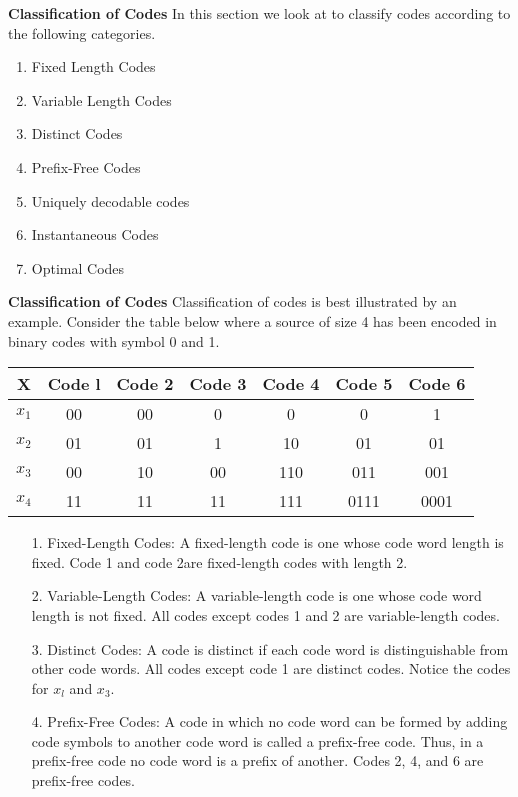 

\noindent \textbf{Classification of Codes}
In this section we look at to classify codes according to the following categories.
\begin{enumerate}
\item Fixed Length Codes
\item Variable Length Codes
\item Distinct Codes
\item Prefix-Free Codes
\item Uniquely decodable codes
\item Instantaneous Codes
\item Optimal Codes
\end{enumerate}


\noindent \textbf{Classification of Codes}
Classification of codes is best illustrated by an example. Consider the table below where a source of
size 4 has been encoded in binary codes with symbol 0 and 1.\\ \bigskip
\begin{center}
\begin{tabular}{|c| c| c| c| c| c| c|}
\hline
X& Code l& Code 2& Code 3 &Code 4& Code 5& Code 6\\\hline
$x_1$& 00& 00 &0 &0 &0 &1\\
$x_2$& 01& 01 &1 &10 &01 &01\\
$x_3$ &00 &10& 00& 110& 011 &001\\
$x_4$ &11& 11& 11& 111 &0111 &0001\\\hline
\end{tabular}
\end{center}




\begin{itemize}
\item[1.] Fixed-Length Codes: A fixed-length code is one whose code word length is fixed. Code 1 and code 2are
fixed-length codes with length 2.
\item[2.] Variable-Length Codes: A variable-length code is one whose code word length is not fixed. All codes except codes 1 and 2 are variable-length codes.
\item[3.] Distinct Codes:
A code is distinct if each code word is distinguishable from other code words. All codes except code 1 are distinct codes. Notice the codes for $x_l$ and $x_3$.
\item[4.] Prefix-Free Codes:
A code in which no code word can be formed by adding code symbols to another code word is
called a prefix-free code. Thus, in a prefix-free code no code word is a prefix of another. Codes 2, 4,
and 6 are prefix-free codes.
\end{itemize}


